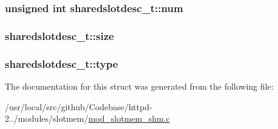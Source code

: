 \subsubsection[{\texorpdfstring{num}{num}}]{\setlength{\rightskip}{0pt plus 5cm}unsigned {\bf int} sharedslotdesc\+\_\+t\+::num}\hypertarget{structsharedslotdesc__t_a640a5fdeca4c3c9a3f19364924bd6447}{}\label{structsharedslotdesc__t_a640a5fdeca4c3c9a3f19364924bd6447}
\subsubsection[{\texorpdfstring{size}{size}}]{ sharedslotdesc\+\_\+t\+::size}\hypertarget{structsharedslotdesc__t_a9d3fe8b72c399a5fe6936ce58b222e49}{}\label{structsharedslotdesc__t_a9d3fe8b72c399a5fe6936ce58b222e49}
\subsubsection[{\texorpdfstring{type}{type}}]{ sharedslotdesc\+\_\+t\+::type}\hypertarget{structsharedslotdesc__t_a4b50c23b68824dd3aefe38db409a4555}{}\label{structsharedslotdesc__t_a4b50c23b68824dd3aefe38db409a4555}


The documentation for this struct was generated from the following file\+:\begin{DoxyCompactItemize}
\item 
/usr/local/src/github/\+Codebase/httpd-\/2../modules/slotmem/\hyperlink{mod__slotmem__shm_8c}{mod\+\_\+slotmem\+\_\+shm.\+c}\end{DoxyCompactItemize}
